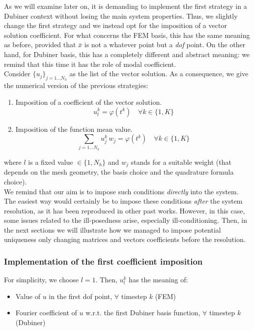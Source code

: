 \documentclass[a4paper,11pt]{article}
\begin{document}
\noindent As we will examine later on, it is demanding to implement the first strategy in a Dubiner context without losing the main system properties. Thus, we slightly change the first strategy and we instead opt for the imposition of a vector solution coefficient. For what concerns the FEM basis, this has the same meaning as before, provided that $\bar{x}$ is not a whatever point but a \emph{dof} point. On the other hand, for Dubiner basis, this has a completely different and abstract meaning: we remind that this time it has the role of modal coefficient. \\

\noindent Consider $\{u_j\}_{j=1 \dots N_h}$ as the list of the vector solution. As a consequence, we give the numerical version of the previous strategies:
\begin{enumerate}
	\item Imposition of a coefficient of the vector solution.
	\begin{equation*}
	u_l^k = \varphi(t^k) \quad \forall k \in \{1,K\}
	\end{equation*}
	\item Imposition of the function mean value.
	\begin{equation*}
	\sum_{j=1\dots N_h} u_j^k \, w_j = \varphi(t^k)\quad \forall k \in \{1,K\}
	\end{equation*}
\end{enumerate}	
where $l$ is a fixed value $\in \{1,N_h\}$ and $w_j$ stands for a suitable weight (that depends on the mesh geometry, the basis choice and the quadrature formula choice). \\

\noindent We remind that our aim is to impose such conditions \emph{directly} into the system. The easiest way would certainly be to impose these conditions \emph{after} the system resolution, as it has been reproduced in other past works. However, in this case, some issues related to the ill-posedness arise, especially ill-conditioning. Then, in the next sections we will illustrate how we managed to impose potential uniqueness only changing matrices and vectors coefficients before the resolution.

\subsubsection{Implementation of the first coefficient imposition} \label{first_coeff_implementation}
For simplicity, we choose $l=1$. Then, $u_l^k$ has the meaning of:
\begin{itemize}
	\item Value of $u$ in the first dof point, $\forall$ timestep $k$ (FEM)
	\item Fourier coefficient of $u$ w.r.t. the first Dubiner basis function, $\forall$ timestep $k$ (Dubiner)
\end{itemize}
\end{document}
